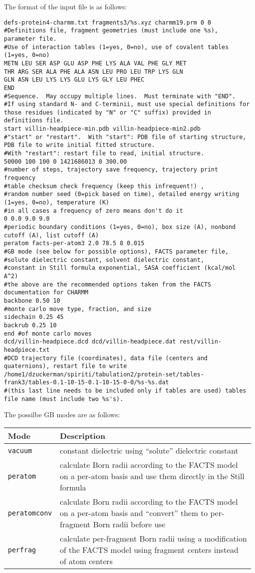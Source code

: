 \documentclass{article}      %
\begin{document}
The format of the input file is as follows:
\begin{lstlisting}
defs-protein4-charmm.txt fragments3/%s.xyz charmm19.prm 0 0
#Definitions file, fragment geometries (must include one %s), parameter file. 
#Use of interaction tables (1=yes, 0=no), use of covalent tables (1=yes, 0=no)
METN LEU SER ASP GLU ASP PHE LYS ALA VAL PHE GLY MET
THR ARG SER ALA PHE ALA ASN LEU PRO LEU TRP LYS GLN
GLN ASN LEU LYS LYS GLU LYS GLY LEU PHEC
END
#Sequence.  May occupy multiple lines.  Must terminate with "END".  
#If using standard N- and C-terminii, must use special definitions for those residues (indicated by "N" or "C" suffix) provided in definitions file.
start villin-headpiece-min.pdb villin-headpiece-min2.pdb
#"start" or "restart".  With "start": PDB file of starting structure, PDB file to write initial fitted structure.  
#With "restart": restart file to read, initial structure.
50000 100 100 0 1421686013 0 300.00
#number of steps, trajectory save frequency, trajectory print frequency
#table checksum check frequency (keep this infrequent!) , 
#random number seed (0=pick based on time), detailed energy writing (1=yes, 0=no), temperature (K)
#in all cases a frequency of zero means don't do it
0 0.0 9.0 9.0
#periodic boundary conditions (1=yes, 0=no), box size (A), nonbond cutoff (A), list cutoff (A)
peratom facts-per-atom3 2.0 78.5 8 0.015
#GB mode (see below for possible options), FACTS parameter file, 
#solute dielectric constant, solvent dielectric constant, 
#constant in Still formula exponential, SASA coefficient (kcal/mol A^2)
#the above are the recommended options taken from the FACTS documentation for CHARMM
backbone 0.50 10
#monte carlo move type, fraction, and size
sidechain 0.25 45
backrub 0.25 10
end #of monte carlo moves
dcd/villin-headpiece.dcd dcd/villin-headpiece.dat rest/villin-headpiece.txt
#DCD trajectory file (coordinates), data file (centers and quaternions), restart file to write
/home1/dzuckerman/spiriti/tabulation2/protein-set/tables-frank3/tables-0.1-10-15-0.1-10-15-0-0/%s-%s.dat
#(this last line needs to be included only if tables are used) tables file name (must include two %s's).
\end{lstlisting}

The possilbe GB modes are as follows:

\begin{center}
\begin{tabular}{|l|p{8cm}|}
\hline
Mode & Description \\
\hline
\verb+vacuum+ & constant dielectric using ``solute'' dielectric constant \\
\hline
\verb+peratom+ & calculate Born radii according to the FACTS model on a per-atom basis and use them directly in the Still formula \\
\hline
\verb+peratomconv+ & calculate  Born radii according to the FACTS model on a per-atom basis and ``convert'' them to per-fragment Born radii before use \\
\hline
\verb+perfrag+ & calculate per-fragment Born radii using a modification of the FACTS model  using fragment centers instead of atom centers \\
\hline
\end{tabular}
\end{center}
\end{document}
